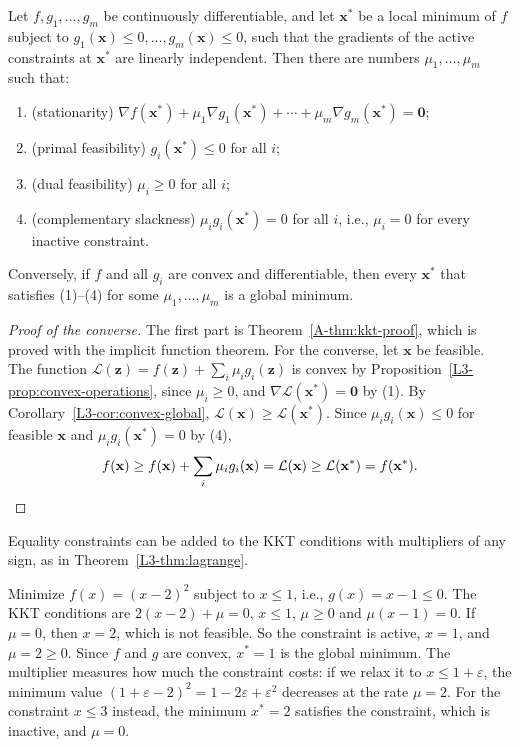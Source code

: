 \begin{theorem}\label{L3-thm:kkt}
    Let $f, g_1, \ldots, g_m$ be continuously differentiable, and let $\mathbf{x}^*$ be a local minimum of $f$ subject to $g_1(\mathbf{x}) \leq 0, \ldots, g_m(\mathbf{x}) \leq 0$, such that the gradients of the active constraints at $\mathbf{x}^*$ are linearly independent. Then there are numbers $\mu_1, \ldots, \mu_m$ such that:
    \begin{enumerate}
        \item (stationarity) $\nabla f(\mathbf{x}^*) + \mu_1\nabla g_1(\mathbf{x}^*) + \cdots + \mu_m\nabla g_m(\mathbf{x}^*) = \mathbf{0}$;
        \item (primal feasibility) $g_i(\mathbf{x}^*) \leq 0$ for all $i$;
        \item (dual feasibility) $\mu_i \geq 0$ for all $i$;
        \item (complementary slackness) $\mu_i g_i(\mathbf{x}^*) = 0$ for all $i$, i.e., $\mu_i = 0$ for every inactive constraint.
    \end{enumerate}
    Conversely, if $f$ and all $g_i$ are convex and differentiable, then every $\mathbf{x}^*$ that satisfies (1)--(4) for some $\mu_1, \ldots, \mu_m$ is a global minimum.
\end{theorem}

\begin{proof}[Proof of the converse]
    The first part is Theorem~\ref{A-thm:kkt-proof}, which is proved with the implicit function theorem. For the converse, let $\mathbf{x}$ be feasible. The function $\mathcal{L}(\mathbf{z}) = f(\mathbf{z}) + \sum_i \mu_i g_i(\mathbf{z})$ is convex by Proposition~\ref{L3-prop:convex-operations}, since $\mu_i \geq 0$, and $\nabla\mathcal{L}(\mathbf{x}^*) = \mathbf{0}$ by (1). By Corollary~\ref{L3-cor:convex-global}, $\mathcal{L}(\mathbf{x}) \geq \mathcal{L}(\mathbf{x}^*)$. Since $\mu_i g_i(\mathbf{x}) \leq 0$ for feasible $\mathbf{x}$ and $\mu_i g_i(\mathbf{x}^*) = 0$ by (4),
    \[f(\mathbf{x}) \geq f(\mathbf{x}) + \sum_i \mu_i g_i(\mathbf{x}) = \mathcal{L}(\mathbf{x}) \geq \mathcal{L}(\mathbf{x}^*) = f(\mathbf{x}^*).\qedhere\]
\end{proof}

Equality constraints can be added to the KKT conditions with multipliers of any sign, as in Theorem~\ref{L3-thm:lagrange}.

\begin{example}\label{L3-ex:kkt-1d}
    Minimize $f(x) = (x - 2)^2$ subject to $x \leq 1$, i.e., $g(x) = x - 1 \leq 0$. The KKT conditions are $2(x - 2) + \mu = 0$, $x \leq 1$, $\mu \geq 0$ and $\mu(x - 1) = 0$. If $\mu = 0$, then $x = 2$, which is not feasible. So the constraint is active, $x = 1$, and $\mu = 2 \geq 0$. Since $f$ and $g$ are convex, $x^* = 1$ is the global minimum. The multiplier measures how much the constraint costs: if we relax it to $x \leq 1 + \varepsilon$, the minimum value $(1 + \varepsilon - 2)^2 = 1 - 2\varepsilon + \varepsilon^2$ decreases at the rate $\mu = 2$. For the constraint $x \leq 3$ instead, the minimum $x^* = 2$ satisfies the constraint, which is inactive, and $\mu = 0$.
\end{example}


